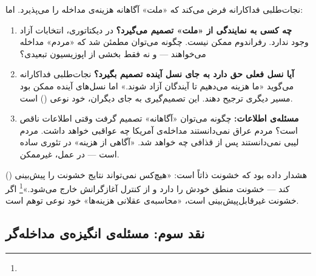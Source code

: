 \begin{tcolorbox}[wavebox, title={پارادوکس نمایندگی}]
نجات‌طلبی فداکارانه فرض می‌کند که «ملت» آگاهانه هزینه‌ی مداخله را می‌پذیرد. اما:

\begin{enumerate}
\item \textbf{چه کسی به نمایندگی از «ملت» تصمیم می‌گیرد؟} در دیکتاتوری، انتخابات آزاد وجود ندارد. رفراندوم ممکن نیست. چگونه می‌توان مطمئن شد که «مردم» مداخله می‌خواهند — و نه فقط بخشی از اپوزیسیون تبعیدی؟
\item \textbf{آیا نسل فعلی حق دارد به جای نسل آینده تصمیم بگیرد؟} نجات‌طلبی فداکارانه می‌گوید «ما هزینه می‌دهیم تا آیندگان آزاد شوند.» اما نسل‌های آینده ممکن بود مسیر دیگری ترجیح دهند. این تصمیم‌گیری به جای دیگران، خود نوعی  () است.
\item \textbf{مسئله‌ی اطلاعات:} چگونه می‌توان «آگاهانه» تصمیم گرفت وقتی اطلاعات ناقص است؟ مردم عراق نمی‌دانستند مداخله‌ی آمریکا چه عواقبی خواهد داشت. مردم لیبی نمی‌دانستند پس از قذافی چه خواهد شد. «آگاهی از هزینه» در تئوری ساده است — در عمل، غیرممکن.
\end{enumerate}
\end{tcolorbox}

 () هشدار داده بود که خشونت ذاتاً  است: «هیچ‌کس نمی‌تواند نتایج خشونت را پیش‌بینی کند — خشونت منطق خودش را دارد و از کنترل آغازگرانش خارج می‌شود.»\footnote{} اگر خشونت غیرقابل‌پیش‌بینی است، «محاسبه‌ی عقلانی هزینه‌ها» خود نوعی توهم است.

\subsection{نقد سوم: مسئله‌ی انگیزه‌ی مداخله‌گر}
\label{subsec:ch15-critique-motives}

